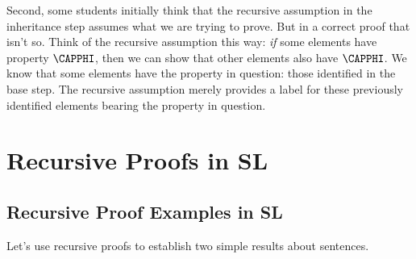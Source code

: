 Second, some students initially think that the recursive assumption in the inheritance step assumes what we are trying to prove.
But in a correct proof that isn't so.
Think of the recursive assumption this way: \emph{if} some elements have property $\CAPPHI$, then we can show that other elements also have $\CAPPHI$.
We know that some elements have the property in question: those identified in the base step.
The recursive assumption merely provides a label for these previously identified elements bearing the property in question.

\section{Recursive Proofs in SL}\label{recursive proofs in SL}

\subsection{Recursive Proof Examples in SL}

Let's use recursive proofs to establish two simple results about \GSL{} sentences.  

